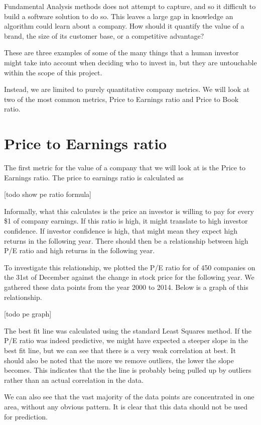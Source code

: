 \documentclass{report}
\begin{document}
Fundamental Analysis methods does not attempt to capture, and so it difficult to build a software solution to do so. This leaves a large gap in knowledge an algorithm could learn about a company. How should it quantify the value of a brand, the size of its customer base, or a competitive advantage?

These are three examples of some of the many things that a human investor might take into account when deciding who to invest in, but they are untouchable within the scope of this project. 

Instead, we are limited to purely quantitative company metrics. We will look at two of the most common metrics, Price to Earnings ratio and Price to Book ratio.

\section{Price to Earnings ratio}

The first metric for the value of a company that we will look at is the Price to Earnings ratio. The price to earnings ratio is calculated as

[todo show pe ratio formula]

Informally, what this calculates is the price an investor is willing to pay for every \$1 of company earnings. If this ratio is high, it might translate to high investor confidence. If investor confidence is high, that might mean they expect high returns in the following year. There should then be a relationship between high P/E ratio and high returns in the following year.

To investigate this relationship, we plotted the P/E ratio for of 450 companies on the 31st of December against the change in stock price for the following year. We gathered these data points from the year 2000 to 2014. Below is a graph of this relationship.

[todo pe graph]

The best fit line was calculated using the standard Least Squares method. If the P/E ratio was indeed predictive, we might have expected a steeper slope in the best fit line, but we can see that there is a very weak correlation at best. It should also be noted that the more we remove outliers, the lower the slope becomes. This indicates that the the line is probably being pulled up by outliers rather than an actual correlation in the data. 

We can also see that the vast majority of the data points are concentrated in one area, without any obvious pattern. It is clear that this data should not be used for prediction.
\end{document}
